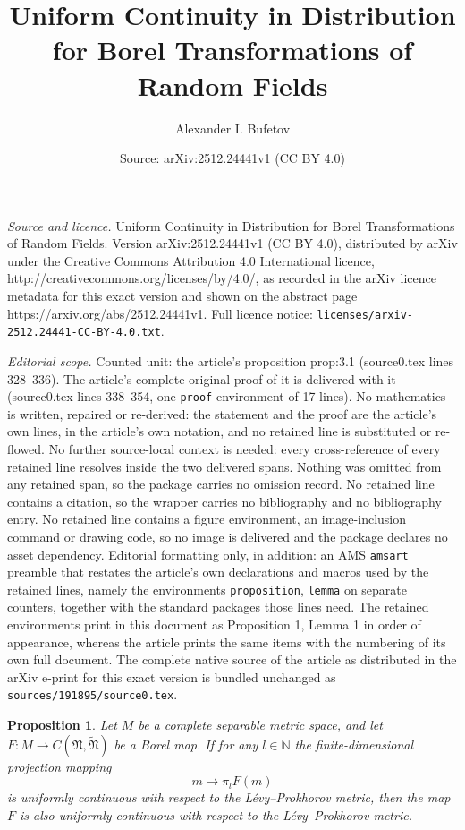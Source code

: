 \documentclass[10pt,a4paper]{amsart}
\title{Uniform Continuity in Distribution for Borel Transformations of Random Fields}
\author{Alexander I. Bufetov}
\date{Source: arXiv:2512.24441v1 (CC BY 4.0)}
\newtheorem{proposition}{Proposition}
\newcommand{\NN}{{\mathfrak{N}}}
\begin{document}
\maketitle

\noindent\emph{Source and licence.} Uniform Continuity in Distribution for Borel Transformations of Random Fields. Version arXiv:2512.24441v1 (CC BY 4.0), distributed by arXiv under the Creative Commons Attribution 4.0 International licence, http://creativecommons.org/licenses/by/4.0/, as recorded in the arXiv licence metadata for this exact version and shown on the abstract page https://arxiv.org/abs/2512.24441v1. Full licence notice: \texttt{licenses/arxiv-2512.24441-CC-BY-4.0.txt}.\par\smallskip

\noindent\textit{Editorial scope.} Counted unit: the article's proposition prop:3.1 (source0.tex lines 328--336). The article's complete original proof of it is delivered with it (source0.tex lines 338--354, one \texttt{proof} environment of 17 lines). No mathematics is written, repaired or re-derived: the statement and the proof are the article's own lines, in the article's own notation, and no retained line is substituted or re-flowed.  No further source-local context is needed: every cross-reference of every retained line resolves inside the two delivered spans.  Nothing was omitted from any retained span, so the package carries no omission record.  No retained line contains a citation, so the wrapper carries no bibliography and no bibliography entry.  No retained line contains a figure environment, an image-inclusion command or drawing code, so no image is delivered and the package declares no asset dependency.  Editorial formatting only, in addition: an AMS \texttt{amsart} preamble that restates the article's own declarations and macros used by the retained lines, namely the environments \texttt{proposition}, \texttt{lemma} on separate counters, together with the standard packages those lines need.  The retained environments print in this document as Proposition 1, Lemma 1 in order of appearance, whereas the article prints the same items with the numbering of its own full document.  The complete native source of the article as distributed in the arXiv e-print for this exact version is bundled unchanged as \texttt{sources/191895/source0.tex}.
	\begin{proposition}
		\label{prop:3.1}
		Let $M$ be a complete separable metric space, and let  $F \colon M \to C(\NN, \widetilde{\NN})$ be a Borel map.  If for any $l \in \mathbb{N}$ the 
		 finite-dimensional projection mapping
		\[
		m \mapsto \pi_l F(m)
		\]
		is uniformly continuous with respect to the L\'evy--Prokhorov metric, then the map $F$ is also uniformly continuous with respect to the L\'evy--Prokhorov metric.
	\end{proposition}
\end{document}
